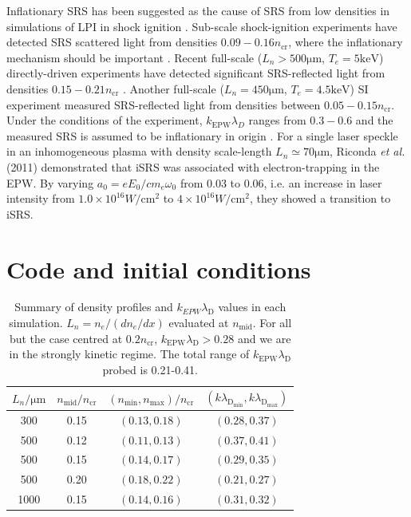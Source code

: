  Inflationary SRS has been suggested as the cause of SRS from low densities
 in simulations of LPI in shock ignition \cite{Klimo2014}. Sub-scale shock-ignition experiments have detected
 SRS scattered light from densities $0.09 - 0.16 n_\mathrm{cr}$, where the inflationary mechanism should be important \cite{Cristoforetti2017}. Recent full-scale ($L_n > 500
 \si{\micro\metre}$, $T_e = 5\si{\kilo \electronvolt}$) directly-driven experiments have detected significant SRS-reflected light from densities $0.15 - 0.21 n_{\mathrm{cr}}$ \cite{Rosenberg2020}. Another full-scale ($L_n = 450
 \si{\micro\metre}$, $T_e = 4.5\si{\kilo \electronvolt}$) SI experiment measured SRS-reflected light from densities between $0.05 - 0.15 n_{\mathrm{cr}}$. Under the conditions of the experiment, $k_{\mathrm{EPW}}\lambda_D$ ranges from $0.3 - 0.6$ and the measured SRS is assumed to be inflationary in origin \cite{Baton2020}.
 For a single laser speckle in an inhomogeneous plasma with density
 scale-length $L_n\simeq 70 \si{\micro\metre}$, Riconda {\it et al.} (2011) \cite{Riconda2011} demonstrated
 that iSRS  was associated
 with electron-trapping in the EPW. By varying $a_0=eE_0/c m_e \omega_0$ from 0.03 to 0.06, i.e. an increase in
 laser intensity from $1.0\times10^{16} \si{W/\centi\metre^2}$ to $4\times10^{16} \si{W/\centi\metre^2}$, they showed
 a transition to iSRS.

\section{Code and initial conditions}\label{sec:code&IC}

\begin{table}[ht]
    \caption{\label{tab:densities}
        Summary of density profiles and $k_{EPW}\lambda_\mathrm{D}$ values in each simulation. $L_n=n_e/(dn_e/dx)$ evaluated at $n_\mathrm{mid}$. For all but the case centred at $0.2n_\mathrm{cr}$, $k_\mathrm{EPW}\lambda_\mathrm{D} > 0.28$ and we are in the strongly kinetic regime. The total range of $k_\mathrm{EPW}\lambda_\mathrm{D}$ probed is 0.21-0.41.
        }
    \begin{center}
    \begin{tabular}{|c|c|c|c|}
    $L_n/\si{\micro \metre}$  & $n_\mathrm{mid}/n_\mathrm{cr}$ & $(n_\mathrm{min},n_\mathrm{max})/n_\mathrm{cr}$ &$(k\lambda_\mathrm{D_{min}},k\lambda_\mathrm{D_{max}})$\\
    \hline
    300& 0.15  & $(0.13,0.18)$ & $(0.28,0.37)$\\
    500 & 0.12 &$(0.11,0.13)$ & $(0.37,0.41)$\\
    500 & 0.15 & $(0.14,0.17)$& $(0.29,0.35)$ \\
    500 & 0.20 & $(0.18,0.22)$& $(0.21,0.27)$\\
    1000 & 0.15 & $(0.14,0.16)$ & $(0.31,0.32)$ \\
    \end{tabular}
    \end{center}
\end{table}

